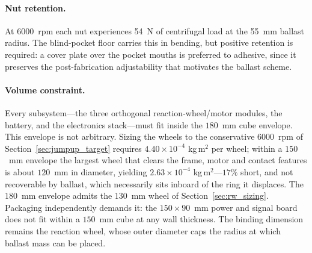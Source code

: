\paragraph{Nut retention.} At \qty{6000}{rpm} each nut experiences
\qty{54}{\newton} of centrifugal load at the \qty{55}{\milli\metre} ballast
radius. The blind-pocket floor carries this in bending, but positive retention
is required: a cover plate over the pocket mouths is preferred to adhesive,
since it preserves the post-fabrication adjustability that motivates the
ballast scheme.



\paragraph{Volume constraint.} Every subsystem---the three orthogonal
reaction-wheel/motor modules, the battery, and the electronics stack---must fit
inside the $180$~mm cube envelope. This envelope is not arbitrary. Sizing the
wheels to the conservative \qty{6000}{rpm} of Section~\ref{sec:jumpup_target}
requires $4.40\times10^{-4}$ kg\,m$^2$ per wheel; within a $150$~mm envelope
the largest wheel that clears the frame, motor and contact features is about
$120$~mm in diameter, yielding $2.63\times10^{-4}$ kg\,m$^2$---$17\%$ short,
and not recoverable by ballast, which necessarily sits inboard of the ring it
displaces. The $180$~mm envelope admits the $130$~mm wheel of
Section~\ref{sec:rw_sizing}. Packaging independently demands it: the
$150\times90$~mm power and signal board does not fit within a $150$~mm cube at
any wall thickness. The binding dimension remains the reaction wheel, whose
outer diameter caps the radius at which ballast mass can be placed.



\caption{Derived actuation parameters (computed from the supplied BOM; order-of-magnitude, assuming a \qty{180}{\milli\metre}, \qty{1.45}{\kilo\gram} cube).}

